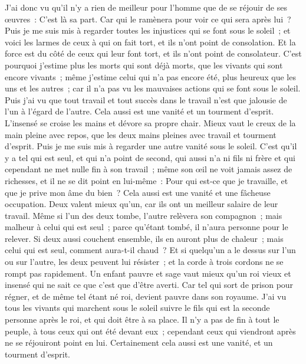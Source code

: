 \begin{multicols}{2}
J'ai donc vu qu'il n'y a rien de meilleur pour l'homme que de se réjouir de ses œuvres~: C'est là sa part. Car qui le ramènera pour voir ce qui sera après lui~?
\VerseOne{}Puis je me suis mis à regarder toutes les injustices qui se font sous le soleil~; et voici les larmes de ceux à qui on fait tort, et ils n'ont point de consolation. Et la force est du côté de ceux qui leur font tort, et ils n'ont point de consolateur. 
C'est pourquoi j'estime plus les morts qui sont déjà morts, que les vivants qui sont encore vivants~;
même j'estime celui qui n'a pas encore été, plus heureux que les uns et les autres~; car il n'a pas vu les mauvaises actions qui se font sous le soleil.
Puis j'ai vu que tout travail et tout succès dans le travail n'est que jalousie de l'un à l'égard de l'autre. Cela aussi est une vanité et un tourment d'esprit. 
L'insensé se croise les mains et dévore sa propre chair.
Mieux vaut le creux de la main pleine avec repos, que les deux mains pleines avec travail et tourment d'esprit. 
Puis je me suis mis à regarder une autre vanité sous le soleil. 
C'est qu'il y a tel qui est seul, et qui n'a point de second, qui aussi n'a ni fils ni frère et qui cependant ne met nulle fin à son travail~; même son œil ne voit jamais assez de richesses, et il ne se dit point en lui-même~: Pour qui est-ce que je travaille, et que je prive mon âme du bien~? Cela aussi est une vanité et une fâcheuse occupation.
Deux valent mieux qu'un, car ils ont un meilleur salaire de leur travail.
Même si l'un des deux tombe, l'autre relèvera son compagnon~; mais malheur à celui qui est seul~; parce qu'étant tombé, il n'aura personne pour le relever. 
Si deux aussi couchent ensemble, ils en auront plus de chaleur~; mais celui qui est seul, comment aura-t-il chaud~? 
Et si quelqu'un a le dessus sur l'un ou sur l'autre, les deux peuvent lui résister~; et la corde à trois cordons ne se rompt pas rapidement.
Un enfant pauvre et sage vaut mieux qu'un roi vieux et insensé qui ne sait ce que c'est que d'être averti.
Car tel qui sort de prison pour régner, et de même tel étant né roi, devient pauvre dans son royaume.
J'ai vu tous les vivants qui marchent sous le soleil suivre le fils qui est la seconde personne après le roi, et qui doit être à sa place. 
Il n'y a pas de fin à tout le peuple, à tous ceux qui ont été devant eux~; cependant ceux qui viendront après ne se réjouiront point en lui. Certainement cela aussi est une vanité, et un tourment d'esprit. 

\end{multicols}
